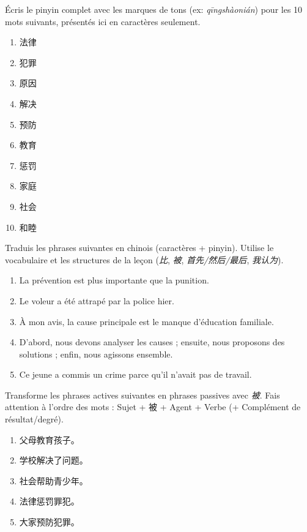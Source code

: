 \documentclass[11pt]{article}
\newcounter{popsec}
\newcounter{popsub}
\newcommand{\courssub}[1]{%
  \stepcounter{popsub}%
  \par\vspace{9pt}\noindent{\popxbold\fontsize{11.5}{13}\selectfont\color{popink}{\color{poporange}\thepopsec.\thepopsub}\hspace{6pt}#1}\par\nopagebreak\vspace{4pt}
}
\begin{document}
\begin{exercice}
Écris le pinyin complet avec les marques de tons (ex: \emph{qīngshàonián}) pour les 10 mots suivants, présentés ici en caractères seulement.
\begin{enumerate}
    \item 法律
    \item 犯罪
    \item 原因
    \item 解决
    \item 预防
    \item 教育
    \item 惩罚
    \item 家庭
    \item 社会
    \item 和睦
\end{enumerate}
\end{exercice}

\courssub{Je m'entraîne}

\begin{exercice}
Traduis les phrases suivantes en chinois (caractères + pinyin). Utilise le vocabulaire et les structures de la leçon (\emph{比}, \emph{被}, \emph{首先/然后/最后}, \emph{我认为}).
\begin{enumerate}
    \item La prévention est plus importante que la punition.
    \item Le voleur a été attrapé par la police hier.
    \item À mon avis, la cause principale est le manque d'éducation familiale.
    \item D'abord, nous devons analyser les causes ; ensuite, nous proposons des solutions ; enfin, nous agissons ensemble.
    \item Ce jeune a commis un crime parce qu'il n'avait pas de travail.
\end{enumerate}
\end{exercice}

\begin{exercice}
Transforme les phrases actives suivantes en phrases passives avec \emph{被}. Fais attention à l'ordre des mots : Sujet + 被 + Agent + Verbe (+ Complément de résultat/degré).
\begin{enumerate}
    \item 父母教育孩子。
    \item 学校解决了问题。
    \item 社会帮助青少年。
    \item 法律惩罚罪犯。
    \item 大家预防犯罪。
\end{enumerate}
\end{exercice}
\end{document}
